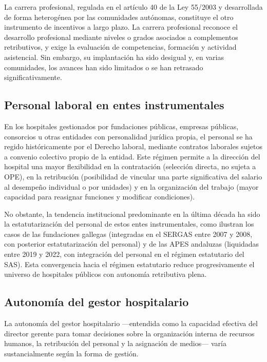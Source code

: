La carrera profesional, regulada en el artículo 40 de la Ley 55/2003 y desarrollada de forma heterogénea por las comunidades autónomas, constituye el otro instrumento de incentivos a largo plazo. La carrera profesional reconoce el desarrollo profesional mediante niveles o grados asociados a complementos retributivos, y exige la evaluación de competencias, formación y actividad asistencial. Sin embargo, su implantación ha sido desigual y, en varias comunidades, los avances han sido limitados o se han retrasado significativamente.

\subsection{Personal laboral en entes instrumentales}

En los hospitales gestionados por fundaciones públicas, empresas públicas, consorcios u otras entidades con personalidad jurídica propia, el personal se ha regido históricamente por el Derecho laboral, mediante contratos laborales sujetos a convenio colectivo propio de la entidad. Este régimen permite a la dirección del hospital una mayor flexibilidad en la contratación (selección directa, no sujeta a OPE), en la retribución (posibilidad de vincular una parte significativa del salario al desempeño individual o por unidades) y en la organización del trabajo (mayor capacidad para reasignar funciones y modificar condiciones).

No obstante, la tendencia institucional predominante en la última década ha sido la estatutarización del personal de estos entes instrumentales, como ilustran los casos de las fundaciones gallegas (integradas en el SERGAS entre 2007 y 2008, con posterior estatutarización del personal) y de las APES andaluzas (liquidadas entre 2019 y 2022, con integración del personal en el régimen estatutario del SAS). Esta convergencia hacia el régimen estatutario reduce progresivamente el universo de hospitales públicos con autonomía retributiva plena.

\subsection{Autonomía del gestor hospitalario}

La autonomía del gestor hospitalario ---entendida como la capacidad efectiva del director gerente para tomar decisiones sobre la organización interna de recursos humanos, la retribución del personal y la asignación de medios--- varía sustancialmente según la forma de gestión.

